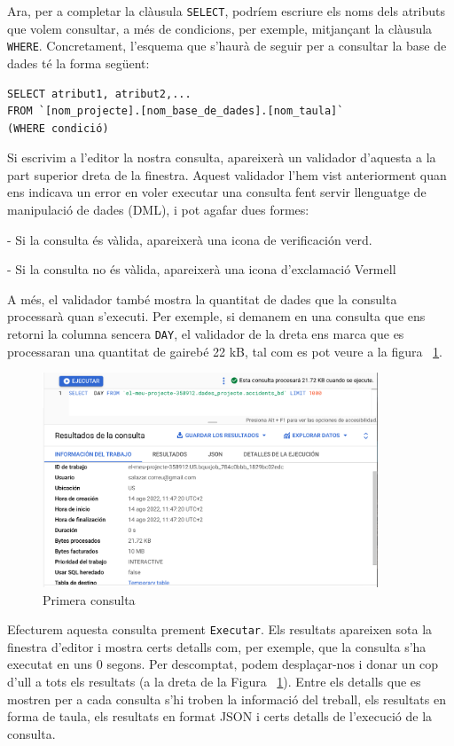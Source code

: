 \documentclass[11pt,longbibliography]{article}
\theoremstyle{definition}
\theoremstyle{remark}
\begin{document}
Ara, per a completar la clàusula \verb|SELECT|, podríem escriure els noms dels atributs que volem consultar, a més de condicions, per exemple, mitjançant la clàusula \verb|WHERE|. Concretament, l'esquema que s'haurà de seguir per a consultar la base de dades té la forma següent:


\begin{verbatim}
SELECT atribut1, atribut2,...
FROM `[nom_projecte].[nom_base_de_dades].[nom_taula]`
(WHERE condició)
\end{verbatim}



Si escrivim a l’editor la nostra consulta, apareixerà un validador d’aquesta a la part superior dreta de la finestra. Aquest validador l'hem vist anteriorment quan ens indicava un error en voler executar una consulta fent servir llenguatge de manipulació de dades (DML), i pot agafar dues formes:

- Si la consulta és vàlida, apareixerà una icona de verificación verd.

- Si la consulta no és vàlida, apareixerà una icona d’exclamació Vermell

A més, el validador també mostra la quantitat de dades que la consulta processarà quan s’executi. Per exemple, si demanem en una consulta que ens retorni la columna sencera \verb|DAY|, el validador de la dreta ens marca que es processaran una quantitat de gairebé 22 kB, tal com es pot veure a la figura ~\ref{fig:bq19}.


\begin{figure}[h!]
\begin{center}
\includegraphics[width=10cm]{bq19}
\end{center}
\caption{Primera consulta}
\label{fig:bq19}
\end{figure}


Efecturem aquesta consulta prement \verb|Executar|. Els resultats apareixen sota la finestra d'editor i mostra certs detalls com, per exemple, que la consulta s'ha executat en uns 0 segons. Per descomptat, podem desplaçar-nos i donar un cop d'ull a tots els resultats (a la dreta de la Figura ~\ref{fig:bq19}). Entre els detalls que es mostren per a cada consulta s'hi troben la informació del treball, els resultats en forma de taula, els resultats en format JSON i certs detalls de l'execució de la consulta. 
\end{document}
